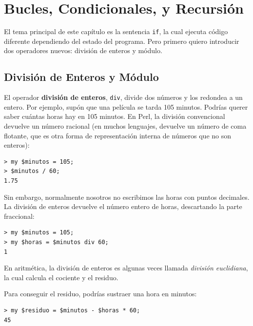 \chapter{Bucles, Condicionales, y Recursión}
\label{conditionals}

El tema principal de  este capítulo es la sentencia {\tt if},
la cual ejecuta código diferente dependiendo del estado
del programa. Pero primero quiero introducir dos operadores
nuevos: división de enteros y módulo.


\section{División de Enteros y Módulo}

El operador {\bf división de enteros}, \verb"div", 
divide dos números y los redondea a un entero. Por ejemplo,
supón que una película se tarda 105 minutos. Podrías querer
saber cuántas horas hay en 105 minutos. En Perl, la división
convencional devuelve un número racional (en muchos lenguajes,
devuelve un número de coma flotante, que es otra forma
de representación interna de números que no son enteros):

\begin{lstlisting}
> my $minutos = 105;
> $minutos / 60;
1.75
\end{lstlisting}

Sin embargo, normalmente nosotros no escribimos las horas con
puntos decimales. La división de enteros devuelve el número
entero de horas, descartando la parte fraccional:

\begin{lstlisting}
> my $minutos = 105;
> my $horas = $minutos div 60;
1
\end{lstlisting}

En aritmética, la división de enteros es algunas veces
llamada \emph{división euclidiana}, la cual calcula el
cociente y el residuo.

Para conseguir el residuo, podrías sustraer una hora en 
minutos:

\begin{lstlisting}
> my $residuo = $minutos - $horas * 60;
45
\end{lstlisting}


